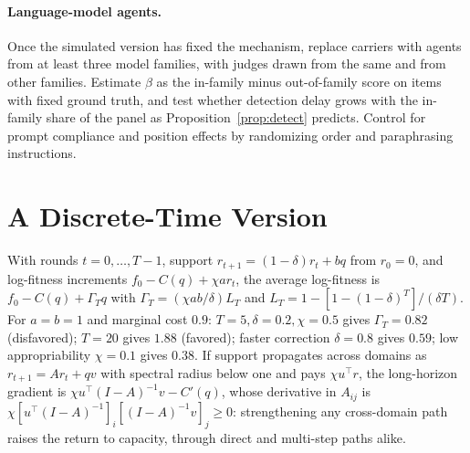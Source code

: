 \documentclass[letterpaper]{article} %
\theoremstyle{definition}
\begin{document}
\paragraph{Language-model agents.} Once the simulated version has fixed the mechanism, replace carriers with agents from at least three model families, with judges drawn from the same and from other families. Estimate $\beta$ as the in-family minus out-of-family score on items with fixed ground truth, and test whether detection delay grows with the in-family share of the panel as Proposition~\ref{prop:detect} predicts. Control for prompt compliance and position effects by randomizing order and paraphrasing instructions.

\section{A Discrete-Time Version}\label{app:discrete}

With rounds $t=0,\dots,T-1$, support $r_{t+1}=(1-\delta)r_t+bq$ from $r_0=0$, and log-fitness increments $f_0-C(q)+\chi ar_t$, the average log-fitness is $f_0-C(q)+\Gamma_Tq$ with $\Gamma_T=(\chi ab/\delta)L_T$ and $L_T=1-[1-(1-\delta)^T]/(\delta T)$. For $a=b=1$ and marginal cost $0.9$: $T=5,\delta=0.2,\chi=0.5$ gives $\Gamma_T=0.82$ (disfavored); $T=20$ gives $1.88$ (favored); faster correction $\delta=0.8$ gives $0.59$; low appropriability $\chi=0.1$ gives $0.38$. If support propagates across domains as $r_{t+1}=Ar_t+qv$ with spectral radius below one and pays $\chi u^\top r$, the long-horizon gradient is $\chi u^\top(I-A)^{-1}v-C'(q)$, whose derivative in $A_{ij}$ is $\chi[u^\top(I-A)^{-1}]_i[(I-A)^{-1}v]_j\ge0$: strengthening any cross-domain path raises the return to capacity, through direct and multi-step paths alike.
\end{document}
